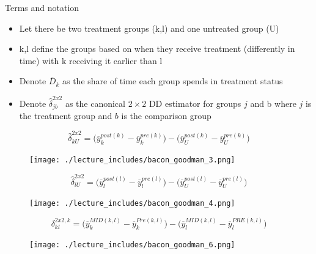 \documentclass{beamer}
\begin{document}
\begin{frame}{Terms and notation}

\begin{itemize}
\item Let there be two treatment groups (k,l) and one untreated group (U)
\item k,l define the groups based on when they receive treatment (differently in time) with k receiving it earlier than l
\item Denote $\overline{D}_k$ as the share of time each group spends in treatment status
\item Denote $\widehat{\delta}_{jb}^{2x2}$ as the canonical $2\times 2$ DD estimator for groups $j$ and b where $j$ is the treatment group and $b$ is the comparison group
\end{itemize}

\end{frame}





\begin{frame}[plain]
$$\widehat{\delta}^{2x2}_{kU} = \bigg ( \overline{y}_k^{post(k)} - \overline{y}_k^{pre(k)} \bigg ) - \bigg ( \overline{y}_U^{post(k)} - \overline{y}_U^{pre(k)} \bigg ) $$
	\begin{figure}
	\texttt{[image: ./lecture\_includes/bacon\_goodman\_3.png]}
	\end{figure}

\end{frame}

\begin{frame}[plain]
$$\widehat{\delta}^{2x2}_{lU} = \bigg ( \overline{y}_l^{post(l)} - \overline{y}_l^{pre(l)} \bigg ) - \bigg ( \overline{y}_U^{post(l)} - \overline{y}_U^{pre(l)} \bigg ) $$
	\begin{figure}
	\texttt{[image: ./lecture\_includes/bacon\_goodman\_4.png]}
	\end{figure}

\end{frame}


\begin{frame}[plain]

$$\delta_{kl}^{2x2,k} = \bigg ( \overline{y}_k^{MID(k,l)} - \overline{y}_k^{Pre(k,l)} \bigg ) - \bigg ( \overline{y}_l^{MID(k,l)} - \overline{y}_l^{PRE(k,l)} \bigg ) $$

	\begin{figure}
	\texttt{[image: ./lecture\_includes/bacon\_goodman\_6.png]}
	\end{figure}

\end{frame}
\end{document}
